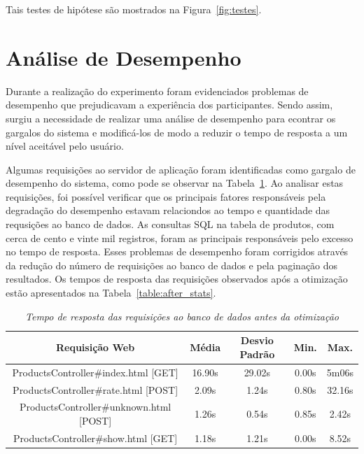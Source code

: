  Tais testes de hipótese são mostrados na Figura~\ref{fig:testes}.

\section{Análise de Desempenho}
\label{sec:analise_de_desempenho}
Durante a realização do experimento foram evidenciados problemas de desempenho que prejudicavam a experiência dos participantes. Sendo assim, surgiu a necessidade de realizar uma análise de desempenho para econtrar os gargalos do sistema e modificá-los de modo a reduzir o tempo de resposta a um nível aceitável pelo usuário.

Algumas requisições ao servidor de aplicação foram identificadas como gargalo de desempenho do sistema, como pode se observar na Tabela~\ref{table:before_stats}. Ao analisar estas requisições, foi possível verificar que os principais fatores responsáveis pela degradação do desempenho estavam relaciondos ao tempo e quantidade das requsições ao banco de dados. As consultas SQL na tabela de produtos, com cerca de cento e vinte mil registros, foram as principais responsáveis pelo excesso no tempo de resposta. Esses problemas de desempenho foram corrigidos através da redução do número de requisições ao banco de dados e pela paginação dos resultados. Os tempos de resposta das requisições observados após a otimização estão apresentados na Tabela~\ref{table:after_stats}.

\begin{table}\centering
\begin{tabular}{c c c c c}
\hline \hline
\textbf{Requisição Web}
& \textbf{Média}
& \textbf{Desvio Padrão}
& \textbf{Min.} 
& \textbf{Max.} \\ \hline
ProductsController\#index.html [GET]    & 16.90s & 29.02s &  0.00s &  5m06s \\
\hline
ProductsController\#rate.html [POST]    &  2.09s &  1.24s &  0.80s & 32.16s \\
\hline
ProductsController\#unknown.html [POST] &  1.26s &  0.54s &  0.85s &  2.42s \\
\hline
ProductsController\#show.html [GET]     &  1.18s &  1.21s &  0.00s &  8.52s \\
\hline
\end{tabular}
\caption{\it Tempo de resposta das requisições ao banco de dados antes da otimização \label{table:before_stats}}
\end{table}

